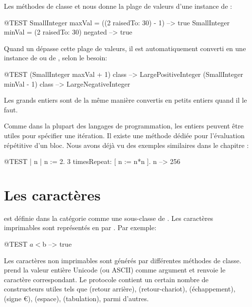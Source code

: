 \documentclass[a4paper,10pt,twoside]{book}
\begin{document}
Les méthodes de classe  et  nous donne la plage de valeurs d'une instance de :

\begin{code}{@TEST}
SmallInteger maxVal = ((2 raisedTo: 30) - 1)      --> true
SmallInteger minVal = (2 raisedTo: 30) negated --> true
\end{code}

Quand un  dépasse cette plage de valeurs, il est automatiquement converti en une instance de  ou de , selon le besoin:

\begin{code}{@TEST}
(SmallInteger maxVal + 1) class --> LargePositiveInteger
(SmallInteger minVal - 1) class  --> LargeNegativeInteger
\end{code}

Les grands entiers sont de la même manière convertis en petits entiers quand il le faut.

Comme dans la plupart des langages de programmation, les entiers peuvent être utiles pour spécifier une itération.  Il existe une méthode dédiée  pour l'évaluation répétitive d'un bloc.
Nous avons déjà vu des exemples similaires dans le chapitre :
\begin{code}{@TEST | n |}
n := 2.
3 timesRepeat: [ n := n*n ].
n --> 256
\end{code}

\section{Les caractères}

 est définie dans la catégorie  comme une sous-classe de . Les caractères imprimables sont représentés en \pharo par .  Par exemple:

\begin{code}{@TEST}
$a < $b --> true
\end{code}

Les caractères non imprimables sont générés par différentes
méthodes de classe. \mbox{} prend la
valeur entière Unicode (ou ASCII) comme argument et renvoie le
caractère correspondant. Le protocole  contient un certain nombre de constructeurs utiles tels
que  
(retour arrière), 
(retour-chariot),
(échappement),
(signe \euro),
(espace), 
(tabulation), 
parmi d'autres.
\end{document}

